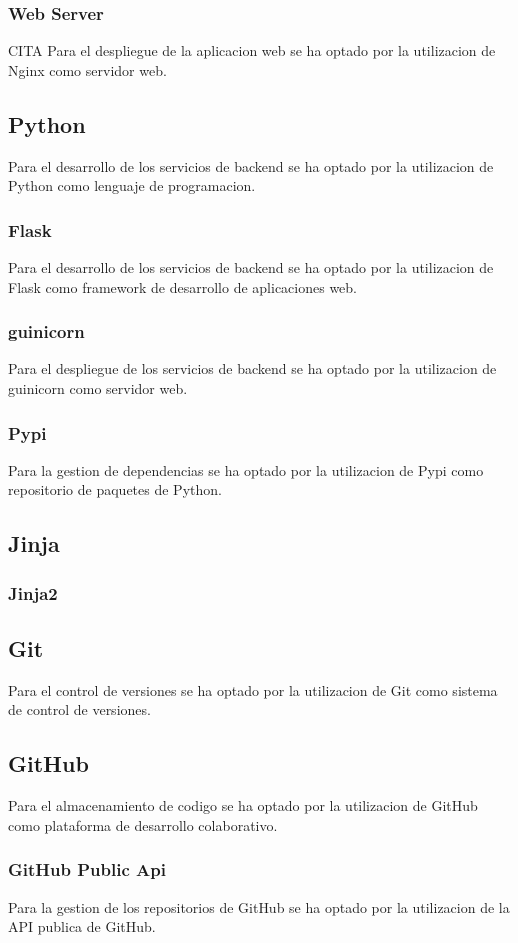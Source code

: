 \documentclass[12pt, a4paper, twoside]{article}
\begin{document}
\subsubsection{Web Server}
CITA
Para el despliegue de la aplicacion web se ha optado por la utilizacion de Nginx como servidor web.

\subsection{Python}
Para el desarrollo de los servicios de backend se ha optado por la utilizacion de Python como lenguaje de programacion.
\subsubsection{Flask}
Para el desarrollo de los servicios de backend se ha optado por la utilizacion de Flask como framework de desarrollo de aplicaciones web.
\subsubsection{guinicorn}
Para el despliegue de los servicios de backend se ha optado por la utilizacion de guinicorn como servidor web.
\subsubsection{Pypi}
Para la gestion de dependencias se ha optado por la utilizacion de Pypi como repositorio de paquetes de Python.

\subsection{Jinja}
\subsubsection{Jinja2}


\subsection{Git}
Para el control de versiones se ha optado por la utilizacion de Git como sistema de control de versiones.
\subsection{GitHub}
Para el almacenamiento de codigo se ha optado por la utilizacion de GitHub como plataforma de desarrollo colaborativo.
\subsubsection{GitHub Public Api}
Para la gestion de los repositorios de GitHub se ha optado por la utilizacion de la API publica de GitHub.
\blindtext
\end{document}
